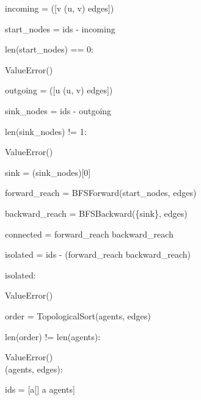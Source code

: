 \begin{subagent}[title=High DoM Parser]
\quad {}

\quad incoming = ([v  (u, v)  edges])

\quad start\_nodes = ids - incoming

\quad {} len(start\_nodes) == 0:

\quad\quad {} ValueError() \\


\quad {}

\quad outgoing = ([u  (u, v)  edges])

\quad sink\_nodes = ids - outgoing

\quad {} len(sink\_nodes) != 1:

\quad\quad {} ValueError() \\


\quad {}

\quad sink = (sink\_nodes)[0]

\quad forward\_reach = BFSForward(start\_nodes, edges)

\quad backward\_reach = BFSBackward(\{sink\}, edges)

\quad connected = forward\_reach  backward\_reach

\quad isolated = ids - (forward\_reach \pykw{\&} backward\_reach)

\quad {} isolated:

\quad\quad {} ValueError() \\


\quad {}

\quad order = TopologicalSort(agents, edges)

\quad {} len(order) != len(agents):

\quad\quad {} ValueError() \\



 (agents, edges):

\quad {}

\quad ids = [a[]  a  agents]


\end{subagent}
